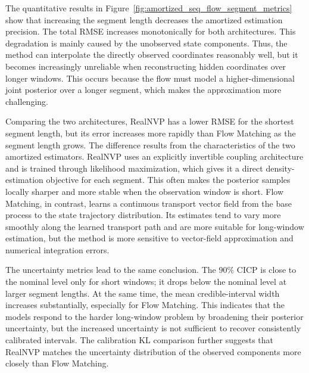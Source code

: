 The quantitative results in Figure~\ref{fig:amortized_seq_flow_segment_metrics} show that increasing the segment length decreases the amortized estimation precision. The total RMSE increases monotonically for both architectures. This degradation is mainly caused by the unobserved state components. Thus, the method can interpolate the directly observed coordinates reasonably well, but it becomes increasingly unreliable when reconstructing hidden coordinates over longer windows. This occurs because the flow must model a higher-dimensional joint posterior over a longer segment, which makes the approximation more challenging.

Comparing the two architectures, RealNVP has a lower RMSE for the shortest segment length, but its error increases more rapidly than Flow Matching as the segment length grows. The difference results from the characteristics of the two amortized estimators. RealNVP uses an explicitly invertible coupling architecture and is trained through likelihood maximization, which gives it a direct density-estimation objective for each segment. This often makes the posterior samples locally sharper and more stable when the observation window is short. Flow Matching, in contrast, learns a continuous transport vector field from the base process to the state trajectory distribution. Its estimates tend to vary more smoothly along the learned transport path and are more suitable for long-window estimation, but the method is more sensitive to vector-field approximation and numerical integration errors. 

The uncertainty metrics lead to the same conclusion. The $90\%$ \ac{CICP} is close to the nominal level only for short windows; it drops below the nominal level at larger segment lengths. At the same time, the mean credible-interval width increases substantially, especially for Flow Matching. This indicates that the models respond to the harder long-window problem by broadening their posterior uncertainty, but the increased uncertainty is not sufficient to recover consistently calibrated intervals. The calibration KL comparison further suggests that RealNVP matches the uncertainty distribution of the observed components more closely than Flow Matching.

